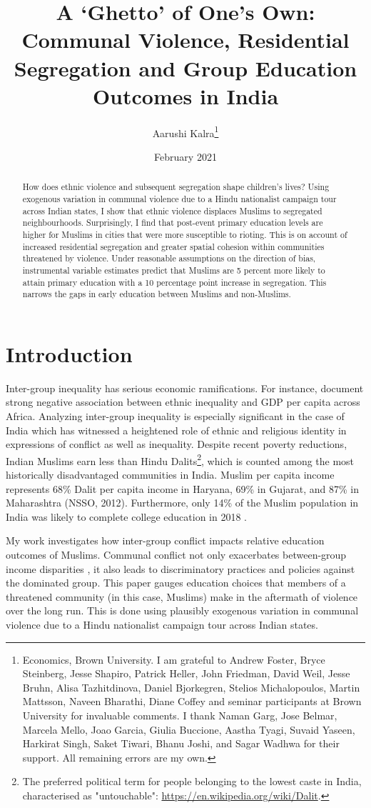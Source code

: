 \documentclass{article}
\title{A `Ghetto' of One's Own: \\
Communal Violence, Residential Segregation and Group Education Outcomes in India}
\author{Aarushi Kalra\thanks{Economics, Brown University. I am grateful to Andrew Foster, Bryce Steinberg, Jesse Shapiro, Patrick Heller, John Friedman, David Weil, Jesse Bruhn, Alisa Tazhitdinova, Daniel Bjorkegren, Stelios Michalopoulos, Martin Mattsson, Naveen Bharathi, Diane Coffey and seminar participants at Brown University for invaluable comments. I thank Naman Garg, Jose Belmar, Marcela Mello, Joao Garcia, Giulia Buccione, Aastha Tyagi, Suvaid Yaseen, Harkirat Singh, Saket Tiwari, Bhanu Joshi, and Sagar Wadhwa for their support. All remaining errors are my own.}}
\date{February 2021}
\begin{document}
\maketitle

\begin{abstract}
    \noindent How does ethnic violence and subsequent segregation shape children's lives? Using exogenous variation in communal violence due to a Hindu nationalist campaign tour across Indian states, I show that ethnic violence displaces Muslims to segregated neighbourhoods. Surprisingly, I find that post-event primary education levels are higher for Muslims in cities that were more susceptible to rioting. This is on account of increased residential segregation and greater spatial cohesion within communities threatened by violence. Under reasonable assumptions on the direction of bias, instrumental variable estimates predict that Muslims are 5 percent more likely to attain primary education with a 10 percentage point increase in segregation. This narrows the gaps in early education between Muslims and non-Muslims.
\end{abstract}

\newpage
\section{Introduction}
Inter-group inequality has serious economic ramifications. For instance, \cite{alesina2016ethnic} document strong negative association between ethnic inequality and GDP per capita across Africa. Analyzing inter-group inequality is especially significant in the case of India which has witnessed a heightened role of ethnic and religious identity in expressions of conflict as well as inequality. Despite recent poverty reductions, Indian Muslims earn less than Hindu Dalits\footnote{The preferred political term for people belonging to the lowest caste in India, characterised as "untouchable": \url{https://en.wikipedia.org/wiki/Dalit}.}, which is counted among the most historically disadvantaged communities in India. Muslim per capita income represents 68\% Dalit per capita income in Haryana, 69\% in Gujarat, and 87\% in Maharashtra (NSSO, 2012). Furthermore, only 14\% of the Muslim population in India was likely to complete college education in 2018 \citep{kalai.2019}. 

My work investigates how inter-group conflict impacts relative education outcomes of Muslims. Communal conflict not only exacerbates between-group income disparities \citep{esteban2011linking}, it also leads to discriminatory practices and policies against the dominated group. This paper gauges education choices that members of a threatened community (in this case, Muslims) make in the aftermath of violence over the long run. This is done using plausibly exogenous variation in communal violence due to a Hindu nationalist campaign tour across Indian states. 
\end{document}
